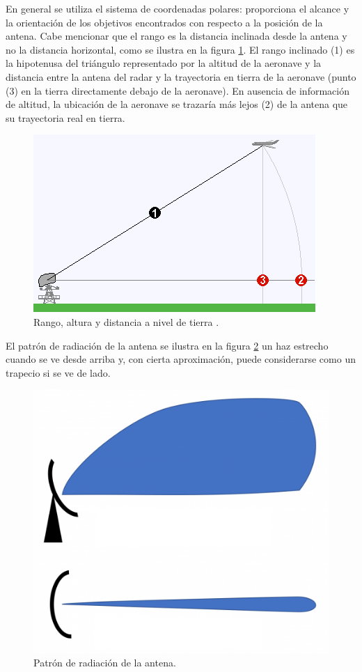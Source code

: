 En general se utiliza el sistema de coordenadas polares: proporciona el alcance y la orientación de los objetivos encontrados con respecto a la posición de la antena. Cabe mencionar que el rango es la distancia inclinada desde la antena y no la distancia horizontal, como se ilustra en la figura \ref{Rango_figura}. El rango inclinado (1) es la hipotenusa del triángulo representado por la altitud de la aeronave y la distancia entre la antena del radar y la trayectoria en tierra de la aeronave (punto (3) en la tierra directamente debajo de la aeronave). En ausencia de información de altitud, la ubicación de la aeronave se trazaría más lejos (2) de la antena que su trayectoria real en tierra.
\begin{figure}
\centering
\includegraphics[scale=0.5]{./Figures/Slant_range.png}
\caption{Rango, altura y distancia a nivel de tierra \citep{WolfgangW}.}
\label{Rango_figura}
\end{figure}

El patrón de radiación de la antena se ilustra en la figura \ref{patrón_de_radiación} un haz estrecho cuando se ve desde arriba y, con cierta aproximación, puede considerarse como un trapecio si se ve de lado.

\begin{figure}
\centering
\includegraphics[scale=0.5]{./Figures/PSR_vistas.png}
\caption{Patrón de radiación de la antena.}
\label{patrón_de_radiación}
\end{figure}

